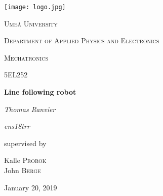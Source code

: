 \begin{titlepage}
    \centering
    \texttt{[image: logo.jpg]} \par\vspace{1cm}
    {\scshape\LARGE Umeå University \par}
    {\scshape\Large Department of Applied Physics and Electronics\par}
    \vspace{1cm}
    {\scshape\Large Mechatronics\par}
    \vspace{0.5cm}
    {\scshape\large 5EL252\par}
    \vspace{1.5cm}
    {\huge\bfseries Line following robot\par}
    \vspace{2cm}
    {\Large\itshape Thomas Ranvier\par}
    {\Large\itshape ens18trr\par}
    \vfill 
    {\large supervised by\par}
    Kalle \textsc{Prorok}
    \\
    John \textsc{Berge}
    \vfill 
    {\large January 20, 2019\par}
\end{titlepage}
